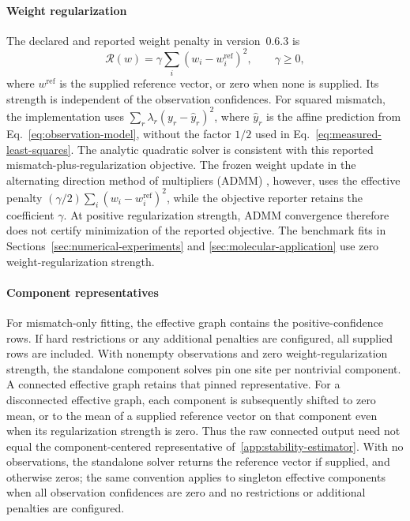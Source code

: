 \paragraph{Weight regularization}
The declared and reported weight penalty in version~0.6.3 is
\[
\mathcal R(w)=\gamma\sum_i(w_i-w_i^{\mathrm{ref}})^2,
\qquad \gamma\ge0,
\]
where $w^{\mathrm{ref}}$ is the supplied reference vector, or zero when none
is supplied. Its strength is independent of the observation confidences.
For squared mismatch, the implementation uses
$\sum_r\lambda_r(y_r-\widehat y_r)^2$, where $\widehat y_r$ is the affine
prediction from Eq.~\eqref{eq:observation-model}, without the factor $1/2$
used in Eq.~\eqref{eq:measured-least-squares}.
The analytic quadratic solver is consistent with this reported
mismatch-plus-regularization objective.
The frozen weight update in the alternating direction method of
multipliers (ADMM) \citep{Boyd2011}, however, uses the effective penalty
$(\gamma/2)\sum_i(w_i-w_i^{\mathrm{ref}})^2$, while the objective
reporter retains the coefficient $\gamma$. At positive regularization
strength, ADMM convergence therefore does not certify minimization of
the reported objective. The benchmark fits in
Sections~\ref{sec:numerical-experiments} and
\ref{sec:molecular-application} use zero weight-regularization strength.

\paragraph{Component representatives}
For mismatch-only fitting, the effective graph contains the positive-confidence rows. If hard restrictions or any additional penalties are configured, all supplied rows are included. With nonempty observations and zero weight-regularization strength, the standalone component solves pin one site per nontrivial component. A connected effective graph retains that pinned representative. For a disconnected effective graph, each component is subsequently shifted to zero mean, or to the mean of a supplied reference vector on that component even when its regularization strength is zero. Thus the raw connected output need not equal the component-centered representative of~\ref{app:stability-estimator}. With no observations, the standalone solver returns the reference vector if supplied, and otherwise zeros; the same convention applies to singleton effective components when all observation confidences are zero and no restrictions or additional penalties are configured.

